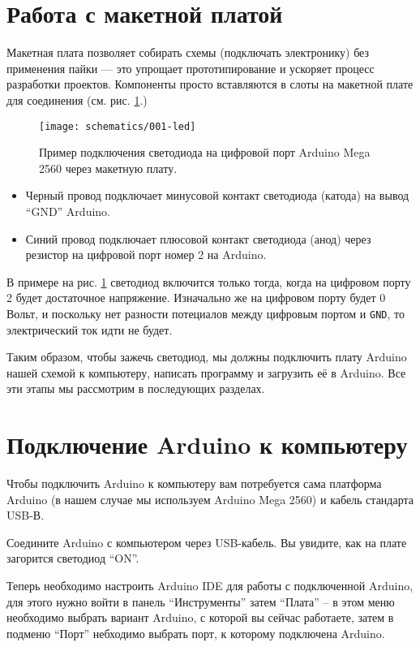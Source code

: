 \documentclass[../sparc.tex]{subfiles}
\begin{document}
\section{Работа с макетной платой}

Макетная плата позволяет собирать схемы (подключать электронику) без применения
пайки --- это упрощает прототипирование и ускоряет процесс разработки проектов.
Компоненты просто вставляются в слоты на макетной плате для соединения
(см. рис. \ref{fig:breadboard-led}.)

\begin{figure}[ht]
  \centering
  \texttt{[image: schematics/001-led]}
  \caption{Пример подключения светодиода на цифровой порт Arduino Mega 2560
    через макетную плату.}
  \label{fig:breadboard-led}
\end{figure}

\begin{itemize}
\item Черный провод подключает минусовой контакт светодиода (катода) на вывод
  ``GND'' Arduino.
\item Синий провод подключает плюсовой контакт светодиода (анод) через резистор
  на цифровой порт номер 2 на Arduino.
\end{itemize}


В примере на рис. \ref{fig:breadboard-led} светодиод включится только тогда,
когда на цифровом порту 2 будет достаточное напряжение.  Изначально же на
цифровом порту будет 0 Вольт, и поскольку нет разности потециалов между цифровым
портом и \texttt{GND}, то электрический ток идти не будет.

Таким образом, чтобы зажечь светодиод, мы должны подключить плату Arduino нашей
схемой к компьютеру, написать программу и загрузить её в Arduino.  Все эти этапы
мы рассмотрим в последующих разделах.

\section{Подключение Arduino к компьютеру}
Чтобы подключить Arduino к компьютеру вам потребуется сама платформа Ardu\-ino
(в нашем случае мы используем Arduino Mega 2560) и кабель стандарта USB-В.

Соедините Arduino с компьютером через USB-кабель. Вы увидите, как на плате
загорится светодиод ``ON''.

Теперь необходимо настроить Arduino IDE для работы с подключенной Ardu\-ino, для
этого нужно войти в панель ``Инструменты'' затем ``Плата'' -- в этом меню
необходимо выбрать вариант Arduino, с которой вы сейчас работаете, затем в
подменю ``Порт'' небходимо выбрать порт, к которому подключена Arduino.
\end{document}
